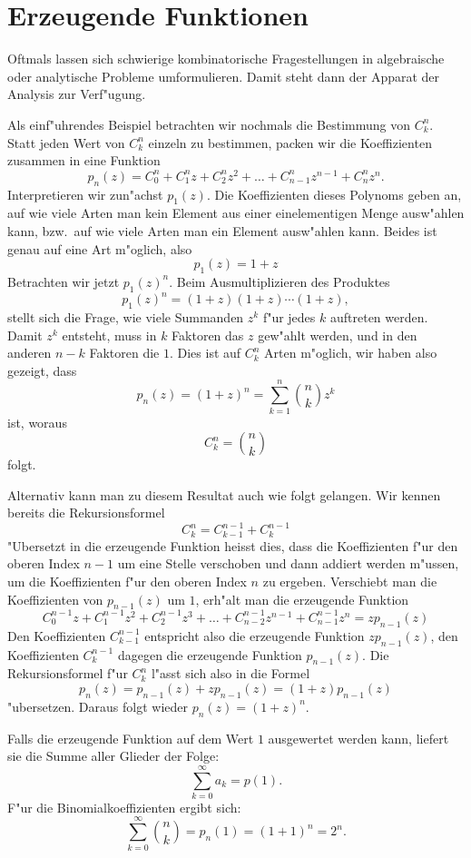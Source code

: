 \section{Erzeugende Funktionen}
Oftmals lassen sich schwierige kombinatorische Fragestellungen in
algebraische oder analytische Probleme umformulieren.
Damit steht
dann der Apparat der Analysis zur Verf"ugung.

Als einf"uhrendes
Beispiel betrachten wir nochmals die Bestimmung von $C^n_k$.
Statt jeden Wert von $C^n_k$ einzeln zu bestimmen, packen wir
die Koeffizienten zusammen in eine Funktion
\[
p_n(z)=C^n_0+C^n_1z +C^n_2z^2+\dots+C^n_{n-1}z^{n-1}+C^n_nz^n.
\]
Interpretieren wir zun"achst $p_1(z)$.
Die Koeffizienten dieses
Polynoms geben an, auf wie viele Arten man kein Element aus einer
einelementigen Menge ausw"ahlen kann, bzw.~auf wie viele Arten man 
ein Element ausw"ahlen kann.
Beides ist genau auf eine Art m"oglich,
also
\[
p_1(z)=1+z
\]
Betrachten wir jetzt $p_1(z)^n$.
Beim Ausmultiplizieren des
Produktes 
\[
p_1(z)^n= (1+z)(1+z)\dotsm(1+z),
\]
stellt sich die Frage, wie viele Summanden $z^k$ f"ur jedes
$k$ auftreten werden.
Damit $z^k$ entsteht, muss in $k$ Faktoren das $z$ gew"ahlt werden,
und in den anderen $n-k$ Faktoren die $1$.
Dies ist auf $C^n_k$
Arten m"oglich, wir haben also gezeigt, dass
\[
p_n(z)=(1+z)^n=\sum_{k=1}^n \binom{n}{k}z^k
\]
ist, woraus
\[
C^n_k=\binom{n}{k}
\]
folgt.

Alternativ kann man zu diesem Resultat auch wie folgt gelangen.
Wir kennen bereits die Rekursionsformel
\[
C^n_k=C^{n-1}_{k-1}+C^{n-1}_k
\]
"Ubersetzt in die erzeugende Funktion heisst dies, dass die Koeffizienten
f"ur den oberen Index $n-1$
um eine Stelle verschoben und dann addiert werden m"ussen,
um die Koeffizienten f"ur den oberen Index $n$ zu ergeben.
Verschiebt
man die Koeffizienten von $p_{n-1}(z)$ um $1$,
erh"alt man die erzeugende Funktion
\[
C^{n-1}_0z
+C^{n-1}_1z^2
+C^{n-1}_2z^3
+\dots
+C^{n-1}_{n-2}z^{n-1}
+C^{n-1}_{n-1}z^n
=zp_{n-1}(z)
\]
Den Koeffizienten $C^{n-1}_{k-1}$ entspricht also die
erzeugende Funktion $zp_{n-1}(z)$,
den Koeffizienten $C^{n-1}_k$ dagegen die erzeugende Funktion $p_{n-1}(z)$.
Die Rekursionsformel f"ur $C^n_k$ l"asst sich also in die Formel
\[
p_n(z)=p_{n-1}(z)+zp_{n-1}(z)=(1+z)p_{n-1}(z)
\]
"ubersetzen.
Daraus folgt wieder $p_n(z)=(1+z)^n$.

Falls die erzeugende Funktion auf dem Wert $1$ ausgewertet werden kann,
liefert sie die Summe aller Glieder der Folge:
\[
\sum_{k=0}^\infty a_k=p(1).
\]
F"ur die Binomialkoeffizienten ergibt sich:
\[
\sum_{k=0}^\infty\binom{n}{k}=p_n(1)=(1+1)^n=2^n.
\]

